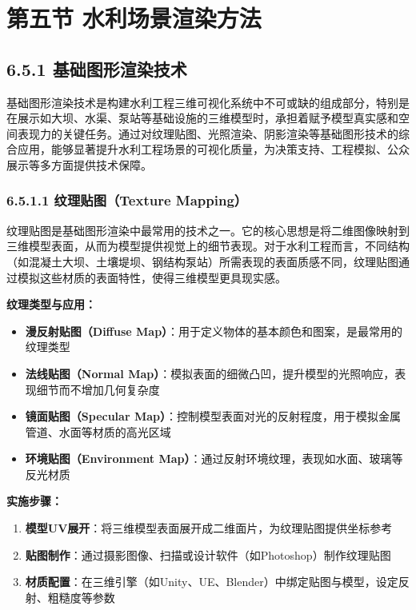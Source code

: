 \section{第五节
水利场景渲染方法}\label{ux7b2cux4e94ux8282-ux6c34ux5229ux573aux666fux6e32ux67d3ux65b9ux6cd5}

\subsection{6.5.1
基础图形渲染技术}\label{ux57faux7840ux56feux5f62ux6e32ux67d3ux6280ux672f}

基础图形渲染技术是构建水利工程三维可视化系统中不可或缺的组成部分，特别是在展示如大坝、水渠、泵站等基础设施的三维模型时，承担着赋予模型真实感和空间表现力的关键任务。通过对纹理贴图、光照渲染、阴影渲染等基础图形技术的综合应用，能够显著提升水利工程场景的可视化质量，为决策支持、工程模拟、公众展示等多方面提供技术保障。

\subsubsection{6.5.1.1 纹理贴图（Texture
Mapping）}\label{ux7eb9ux7406ux8d34ux56fetexture-mapping}

纹理贴图是基础图形渲染中最常用的技术之一。它的核心思想是将二维图像映射到三维模型表面，从而为模型提供视觉上的细节表现。对于水利工程而言，不同结构（如混凝土大坝、土壤堤坝、钢结构泵站）所需表现的表面质感不同，纹理贴图通过模拟这些材质的表面特性，使得三维模型更具现实感。

\textbf{纹理类型与应用：}

\begin{itemize}
\tightlist
\item
  \textbf{漫反射贴图（Diffuse
  Map）}：用于定义物体的基本颜色和图案，是最常用的纹理类型
\item
  \textbf{法线贴图（Normal
  Map）}：模拟表面的细微凸凹，提升模型的光照响应，表现细节而不增加几何复杂度
\item
  \textbf{镜面贴图（Specular
  Map）}：控制模型表面对光的反射程度，用于模拟金属管道、水面等材质的高光区域
\item
  \textbf{环境贴图（Environment
  Map）}：通过反射环境纹理，表现如水面、玻璃等反光材质
\end{itemize}

\textbf{实施步骤：}

\begin{enumerate}
\def\labelenumi{\arabic{enumi}.}
\tightlist
\item
  \textbf{模型UV展开}：将三维模型表面展开成二维面片，为纹理贴图提供坐标参考
\item
  \textbf{贴图制作}：通过摄影图像、扫描或设计软件（如Photoshop）制作纹理贴图
\item
  \textbf{材质配置}：在三维引擎（如Unity、UE、Blender）中绑定贴图与模型，设定反射、粗糙度等参数
\end{enumerate}

